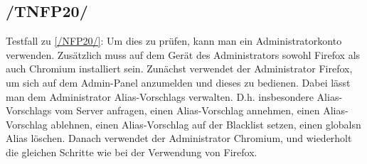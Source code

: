 \subsection*{/TNFP20/}
\label{/TNFP20/} Testfall zu \ref{/NFP20/}: Um dies zu prüfen, kann man ein \Gls{Administrator}konto verwenden. Zusätzlich muss auf dem Gerät des \Gls{Administrator}s sowohl \Gls{Firefox} als auch \Gls{Chromium} installiert sein. Zunächst verwendet der \Gls{Administrator} \Gls{Firefox}, um sich auf dem \Gls{Admin-Panel} anzumelden und dieses zu bedienen. Dabei lässt man dem \Gls{Administrator} \Glspl{Alias-Vorschlag} verwalten. D.h. insbesondere \Glspl{Alias-Vorschlag} vom \Gls{Server} anfragen, einen \Gls{Alias-Vorschlag} annehmen, einen \Gls{Alias-Vorschlag} ablehnen, einen \Gls{Alias-Vorschlag} auf der \Gls{Blacklist} setzen, einen \glspl{global}n \Gls{Alias} löschen. Danach verwendet der \Gls{Administrator} \Gls{Chromium}, und wiederholt die gleichen Schritte wie bei der Verwendung von \Gls{Firefox}.